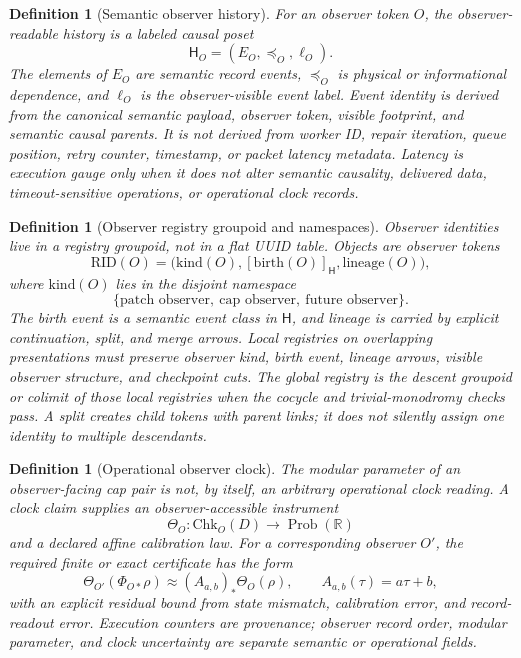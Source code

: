 \documentclass[11pt]{article}
\newtheorem{definition}[theorem]{Definition}
\begin{document}
\begin{definition}[Semantic observer history]\label{def:semantic-observer-history}
For an observer token \(O\), the observer-readable history is a labeled causal poset
\[
\mathsf H_O=(E_O,\preceq_O,\ell_O).
\]
The elements of \(E_O\) are semantic record events, \(\preceq_O\) is physical or informational
dependence, and \(\ell_O\) is the observer-visible event label. Event identity is derived from the
canonical semantic payload, observer token, visible footprint, and semantic causal parents. It is
not derived from worker ID, repair iteration, queue position, retry counter, timestamp, or packet
latency metadata. Latency is execution gauge only when it does not alter semantic causality,
delivered data, timeout-sensitive operations, or operational clock records.
\end{definition}

\begin{definition}[Observer registry groupoid and namespaces]\label{def:observer-registry-groupoid}
Observer identities live in a registry groupoid, not in a flat UUID table. Objects are observer
tokens
\[
\mathrm{RID}(O)=\bigl(\mathrm{kind}(O),[\mathrm{birth}(O)]_{\mathsf H},\mathrm{lineage}(O)\bigr),
\]
where \(\mathrm{kind}(O)\) lies in the disjoint namespace
\[
\{\text{patch observer},\ \text{cap observer},\ \text{future observer}\}.
\]
The birth event is a semantic event class in \(\mathsf H\), and lineage is carried by explicit
continuation, split, and merge arrows. Local registries on overlapping presentations must preserve
observer kind, birth event, lineage arrows, visible observer structure, and checkpoint cuts. The
global registry is the descent groupoid or colimit of those local registries when the cocycle and
trivial-monodromy checks pass. A split creates child tokens with parent links; it does not silently
assign one identity to multiple descendants.
\end{definition}

\begin{definition}[Operational observer clock]\label{def:operational-observer-clock}
The modular parameter of an observer-facing cap pair is not, by itself, an arbitrary operational
clock reading. A clock claim supplies an observer-accessible instrument
\[
\Theta_O:\mathrm{Chk}_O(D)\to\operatorname{Prob}(\mathbb R)
\]
and a declared affine calibration law. For a corresponding observer \(O'\), the required finite
or exact certificate has the form
\[
\Theta_{O'}(\Phi_{O*}\rho)
\approx
(A_{a,b})_*\Theta_O(\rho),
\qquad
A_{a,b}(\tau)=a\tau+b,
\]
with an explicit residual bound from state mismatch, calibration error, and record-readout error.
Execution counters are provenance; observer record order, modular parameter, and clock
uncertainty are separate semantic or operational fields.
\end{definition}
\end{document}
